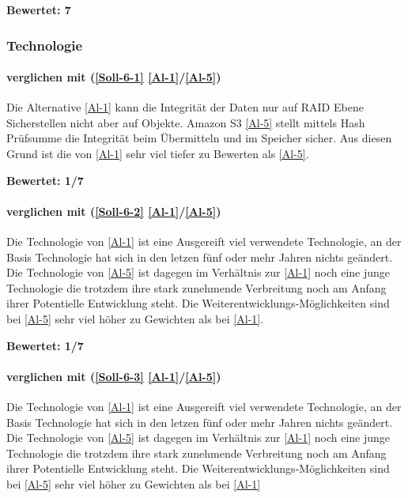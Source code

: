 \textbf{Bewertet: 7}


\subsubsection{Technologie}

\paragraph*{  verglichen mit  (\ref{Soll-6-1} \ref{Al-1}/\ref{Al-5})} 
Die Alternative \ref{Al-1} kann die Integrität der Daten nur auf RAID Ebene Sicherstellen nicht aber auf Objekte. Amazon S3 \ref{Al-5} stellt mittels Hash Prüfsumme die Integrität beim Übermitteln und im Speicher sicher. Aus diesen Grund ist die  von \ref{Al-1} sehr viel tiefer zu Bewerten als \ref{Al-5}.

\textbf{Bewertet: 1/7}

\paragraph*{  verglichen mit  (\ref{Soll-6-2} \ref{Al-1}/\ref{Al-5})} 
Die Technologie von \ref{Al-1} ist eine Ausgereift viel verwendete Technologie, an der Basis Technologie hat sich in den letzen fünf oder mehr Jahren nichts geändert. Die Technologie von \ref{Al-5} ist dagegen im Verhältnis zur \ref{Al-1} noch eine junge Technologie die trotzdem ihre stark zunehmende Verbreitung noch am Anfang ihrer Potentielle Entwicklung steht. Die Weiterentwicklungs-Möglichkeiten sind bei \ref{Al-5} sehr viel höher zu Gewichten als bei \ref{Al-1}.

\textbf{Bewertet: 1/7}

\paragraph*{  verglichen mit  (\ref{Soll-6-3} \ref{Al-1}/\ref{Al-5})} 
Die Technologie von \ref{Al-1} ist eine Ausgereift viel verwendete Technologie, an der Basis Technologie hat sich in den letzen fünf oder mehr Jahren nichts geändert. Die Technologie von \ref{Al-5} ist dagegen im Verhältnis zur \ref{Al-1} noch eine junge Technologie die trotzdem ihre stark zunehmende Verbreitung noch am Anfang ihrer Potentielle Entwicklung steht. Die Weiterentwicklungs-Möglichkeiten sind bei \ref{Al-5} sehr viel höher zu Gewichten als bei \ref{Al-1}

